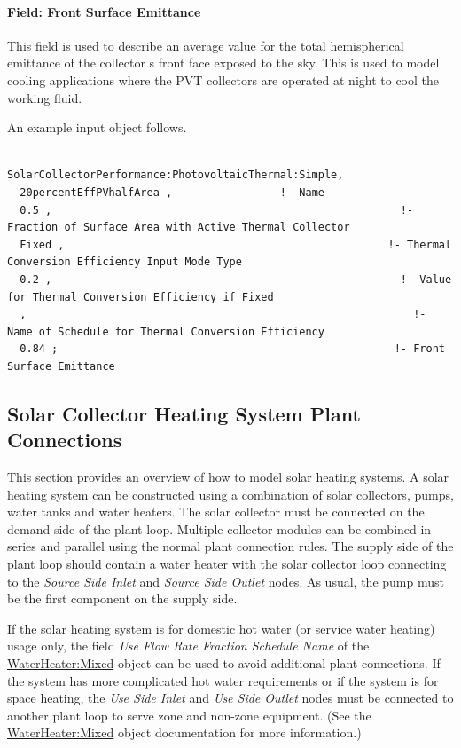 \paragraph{Field: Front Surface Emittance}\label{field-front-surface-emittance}

This field is used to describe an average value for the total hemispherical emittance of the collector s front face exposed to the sky. This is used to model cooling applications where the PVT collectors are operated at night to cool the working fluid.

An example input object follows.

\begin{lstlisting}

SolarCollectorPerformance:PhotovoltaicThermal:Simple,
  20percentEffPVhalfArea ,                 !- Name
  0.5 ,                                                       !- Fraction of Surface Area with Active Thermal Collector
  Fixed ,                                                   !- Thermal Conversion Efficiency Input Mode Type
  0.2 ,                                                       !- Value for Thermal Conversion Efficiency if Fixed
  ,                                                             !- Name of Schedule for Thermal Conversion Efficiency
  0.84 ;                                                     !- Front Surface Emittance
\end{lstlisting}

\subsection{Solar Collector Heating System Plant Connections}\label{solar-collector-heating-system-plant-connections}

This section provides an overview of how to model solar heating systems. A solar heating system can be constructed using a combination of solar collectors, pumps, water tanks and water heaters. The solar collector must be connected on the demand side of the plant loop. Multiple collector modules can be combined in series and parallel using the normal plant connection rules. The supply side of the plant loop should contain a water heater with the solar collector loop connecting to the \emph{Source Side Inlet} and \emph{Source Side Outlet} nodes. As usual, the pump must be the first component on the supply side.

If the solar heating system is for domestic hot water (or service water heating) usage only, the field \emph{Use Flow Rate Fraction Schedule Name} of the \hyperref[waterheatermixed]{WaterHeater:Mixed} object can be used to avoid additional plant connections. If the system has more complicated hot water requirements or if the system is for space heating, the \emph{Use Side Inlet} and \emph{Use Side Outlet} nodes must be connected to another plant loop to serve zone and non-zone equipment. (See the \hyperref[waterheatermixed]{WaterHeater:Mixed} object documentation for more information.)

